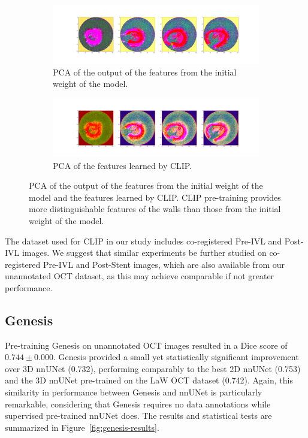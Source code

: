 \documentclass[a4paper,11pt,oneside]{report}
\begin{document}
\begin{figure}[h]
    \centering
    \begin{subfigure}[t]{0.5\textwidth}
        \centering
        \includegraphics[width=\linewidth]{figures/discussion_default_feature_map_batch0_feature1.png}
        \caption{PCA of the output of the features from the initial weight of the model.}
        \label{fig:pca-initial}
    \end{subfigure}%
    \begin{subfigure}[t]{0.5\textwidth}
        \centering
        \includegraphics[width=\linewidth]{figures/discussion_clip_feature_map_batch0_feature1.png}
        \caption{PCA of the features learned by CLIP.}
        \label{fig:pca-clip}
        
    \end{subfigure}
    \caption{PCA of the output of the features from the initial weight of the model and the features learned by CLIP. CLIP pre-training provides more distinguishable features of the walls than those from the initial weight of the model. 
    }
\end{figure}

The dataset used for CLIP in our study includes co-registered Pre-IVL and Post-IVL images. We suggest that similar experiments be further studied on co-registered Pre-IVL and Post-Stent images, which are also available from our unannotated OCT dataset, as this may achieve comparable if not greater performance.

\subsection{Genesis}
Pre-training Genesis on unannotated OCT images resulted in a Dice score of $0.744\pm0.000$. Genesis provided a small yet statistically significant improvement over 3D nnUNet (0.732), performing comparably to the best 2D nnUNet (0.753) and the 3D nnUNet pre-trained on the LaW OCT dataset (0.742). Again, this similarity in performance between Genesis and nnUNet is particularly remarkable, considering that Genesis requires no data annotations while supervised pre-trained nnUNet does. The results and statistical tests are summarized in Figure~\ref{fig:genesis-results}.
\end{document}
